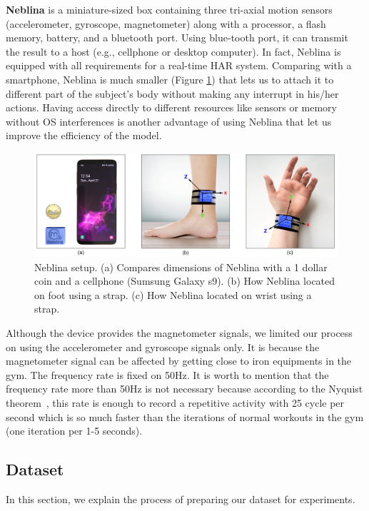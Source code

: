 \documentclass[journal,article,submit,moreauthors,pdftex]{Definitions/mdpi}
\begin{document}
\noindent \textbf{Neblina} is a miniature-sized box containing three tri-axial motion sensors (accelerometer, gyroscope, magnetometer) along with a processor, a flash memory, battery, and a bluetooth port. Using blue-tooth port, it can transmit the result to a host (e.g., cellphone or desktop computer).  In fact, Neblina is equipped with all requirements for a real-time HAR system. Comparing with a smartphone, Neblina is much smaller (Figure \ref{neblina_setup}) that lets us to attach it to different part of the subject's body without making any interrupt in his/her actions\cite{de2018comparative}. Having access directly to different resources like sensors or memory without OS interferences is another advantage of using Neblina that let us improve the efficiency of the model.
\begin{figure}[H]
	\centering
	\includegraphics[width=10 cm]{Definitions/images/neblina_setup.jpg}
	\caption{Neblina setup. (a) Compares dimensions of Neblina with a 1 dollar coin and a cellphone (Sumsung Galaxy s9). (b) How Neblina located on foot using a strap. (c) How Neblina located on wrist using a strap.}
	\label{neblina_setup}
\end{figure} 

Although the device provides the magnetometer signals, we limited our process on using the accelerometer and gyroscope signals only. It is because the magnetometer signal can be affected by getting close to iron equipments in the gym. The frequency rate is fixed on 50Hz. It is worth to mention that the frequency rate more than 50Hz is not necessary because according to the Nyquist theorem~\cite{mazo1975faster}, this rate is enough to record a repetitive activity with 25 cycle per second which is so much faster than the iterations of normal workouts in the gym (one iteration per 1-5 seconds).

\subsection{Dataset}
In this section, we explain the process of preparing our dataset for experiments.
\end{document}
